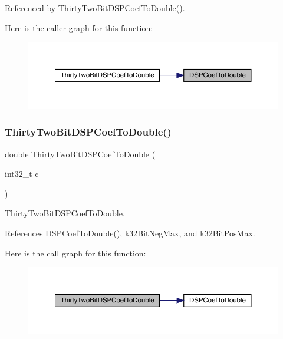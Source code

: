 Referenced by Thirty\+Two\+Bit\+D\+S\+P\+Coef\+To\+Double().

Here is the caller graph for this function\+:
\nopagebreak
\begin{figure}[H]
\begin{center}
\leavevmode
\includegraphics[width=350pt]{a00449_a5e9c399a10a03718eaaf71cfcddd583f_icgraph}
\end{center}
\end{figure}
\mbox{\label{a00449_a52514266bf44c844934aedcd6975037d}} 
\subsubsection{\texorpdfstring{ThirtyTwoBitDSPCoefToDouble()}{ThirtyTwoBitDSPCoefToDouble()}}
{\footnotesize\ttfamily double Thirty\+Two\+Bit\+D\+S\+P\+Coef\+To\+Double (\begin{DoxyParamCaption}\item[{int32\+\_\+t}]{c }\end{DoxyParamCaption})\hspace{0.3cm}{\ttfamily [inline]}}



Thirty\+Two\+Bit\+D\+S\+P\+Coef\+To\+Double. 



References D\+S\+P\+Coef\+To\+Double(), k32\+Bit\+Neg\+Max, and k32\+Bit\+Pos\+Max.

Here is the call graph for this function\+:
\nopagebreak
\begin{figure}[H]
\begin{center}
\leavevmode
\includegraphics[width=350pt]{a00449_a52514266bf44c844934aedcd6975037d_cgraph}
\end{center}
\end{figure}
\mbox{\label{a00449_ab8477bacb0294598f49057507fb17810}} 
